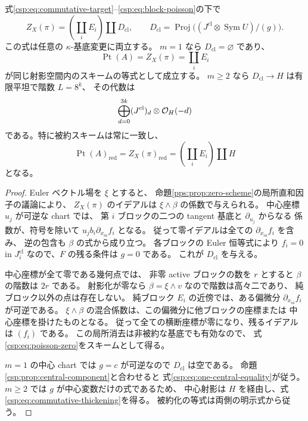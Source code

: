 \begin{theorem}[中心変数を持つ分離和の零スキーム]
\label{csp:thm:poisson-zero}
式\eqref{csp:eq:commutative-target}--\eqref{csp:eq:block-poisson}の下で
\begin{equation}\label{csp:eq:poisson-zero}
 Z_X(\pi)=\left(\coprod_i E_i\right)\amalg D_{\mathrm{cl}},\qquad
 D_{\mathrm{cl}}=\operatorname{Proj}
       \bigl((J^{\mathrm{cl}}\otimes\operatorname{Sym}U)/(g)\bigr).
\end{equation}
この式は任意の $\kappa$-基底変更に両立する。
$m=1$ なら $D_{\mathrm{cl}}=\varnothing$ であり、
\begin{equation}\label{csp:eq:one-central-equality}
 \operatorname{Pt}(A)=Z_X(\pi)=\coprod_iE_i
\end{equation}
が同じ射影空間内のスキームの等式として成立する。
$m\ge2$ なら $D_{\mathrm{cl}}\to H$ は有限平坦で階数 $L=8^k$、
その代数は
\begin{equation}\label{csp:eq:commutative-thickening}
 \bigoplus_{d=0}^{3k}(J^{\mathrm{cl}})_d\otimes\mathcal O_H(-d)
\end{equation}
である。特に被約スキームは常に一致し、
\begin{equation}\label{csp:eq:reduced-equality}
 \operatorname{Pt}(A)_{\mathrm{red}}
   =Z_X(\pi)_{\mathrm{red}}
   =\left(\coprod_iE_i\right)\amalg H
\end{equation}
となる。
\end{theorem}

\begin{proof}
Euler ベクトル場を $\xi$ とすると、
命題\ref{pps:prop:zero-scheme}の局所直和因子の議論により、
$Z_X(\pi)$ のイデアルは $\xi\wedge\beta$ の係数で与えられる。
中心座標 $u_j$ が可逆な chart では、
第 $i$ ブロックの二つの tangent 基底と $\partial_{u_j}$ からなる
係数が、符号を除いて $u_jb_i\partial_{x_{ia}}f_i$ となる。
従って零イデアルは全ての $\partial_{x_{ia}}f_i$ を含み、
逆の包含も $\beta$ の式から成り立つ。
各ブロックの Euler 恒等式により
$f_i=0$ in $J_i^{\mathrm{cl}}$ なので、$F$ の残る条件は $g=0$ である。
これが $D_{\mathrm{cl}}$ を与える。

中心座標が全て零である幾何点では、
非零 active ブロックの数を $r$ とすると $\beta$ の階数は $2r$ である。
射影化が零なら $\beta=\xi\wedge v$ なので階数は高々二であり、
純ブロック以外の点は存在しない。
純ブロック $E_i$ の近傍では、ある偏微分 $\partial_{x_{ia}}f_i$ が可逆である。
$\xi\wedge\beta$ の混合係数は、この偏微分に他ブロックの座標または
中心座標を掛けたものとなる。
従って全ての横断座標が零になり、残るイデアルは $(f_i)$ である。
この局所消去は非被約な基底でも有効なので、
式\eqref{csp:eq:poisson-zero}をスキームとして得る。

$m=1$ の中心 chart では $g=c$ が可逆なので $D_{\mathrm{cl}}$ は空である。
命題\ref{csp:prop:central-component}と合わせると
式\eqref{csp:eq:one-central-equality}が従う。
$m\ge2$ では $g$ が中心変数だけの式であるため、
中心射影は $H$ を経由し、式\eqref{csp:eq:commutative-thickening}を得る。
被約化の等式は両側の明示式から従う。
\end{proof}

